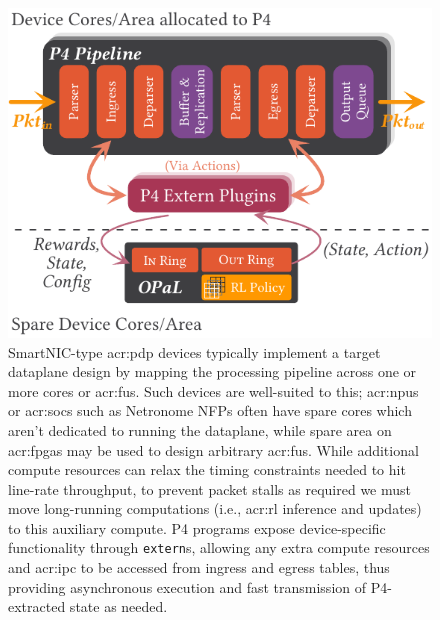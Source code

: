 \begin{figure}
	\centering
	\includegraphics[keepaspectratio, width=0.85\linewidth]{diagrams/opal/arch-with-p4}
	\caption[\approachshort{}'s off-path interaction model with respect to a co-hosted P4 dataplane.]{SmartNIC-type \gls{acr:pdp} devices typically implement a target dataplane design by mapping the processing pipeline across one or more cores or \glspl{acr:fu}. Such devices are well-suited to this; \glspl{acr:npu} or \glspl{acr:soc} such as Netronome NFPs often have spare cores which aren't dedicated to running the dataplane, while spare area on \glspl{acr:fpga} may be used to design arbitrary \glspl{acr:fu}. While additional compute resources can relax the timing constraints needed to hit line-rate throughput, to prevent packet stalls as required we must move long-running computations (i.e., \gls{acr:rl} inference and updates) to this auxiliary compute. P4 programs expose device-specific functionality through \texttt{extern}s, allowing any extra compute resources and \gls{acr:ipc} to be accessed from ingress and egress tables, thus providing asynchronous execution and fast transmission of P4-extracted state as needed.\label{fig:netro-arch}}
\end{figure}

%
%
%

